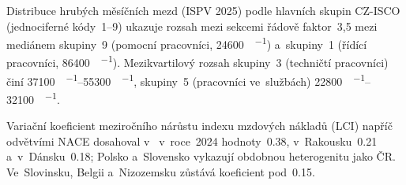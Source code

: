 Distribuce hrubých měsíčních mezd  (\ac{ISPV} 2025) podle hlavních skupin \ac{CZ-ISCO} (jednociferné kódy~1--9) ukazuje rozsah mezi sekcemi řádově faktor~3,5 mezi mediánem skupiny~9 (pomocní pracovníci, \SI{24600}{\czk\per\month}) a~skupiny~1 (řídící pracovníci, \SI{86400}{\czk\per\month}). Mezikvartilový rozsah skupiny~3 (techničtí pracovníci) činí \SIrange{37100}{55300}{\czk\per\month}, skupiny~5 (pracovníci ve~službách) \SIrange{22800}{32100}{\czk\per\month}.

Variační koeficient meziročního nárůstu indexu mzdových nákladů (\ac{LCI}) napříč odvětvími \acs{NACE} dosahoval v~ v~roce~2024 hodnoty~\num{0,38}, v~Rakousku~\num{0,21} a~v~Dánsku~\num{0,18}; Polsko a~Slovensko vykazují obdobnou heterogenitu jako \ac{ČR}. Ve~Slovinsku, Belgii a~Nizozemsku zůstává koeficient pod~\num{0,15}.


